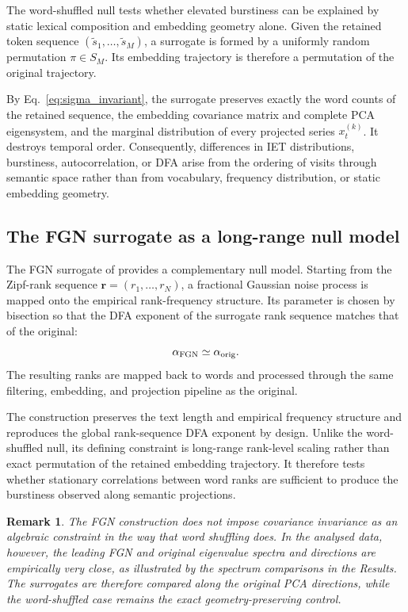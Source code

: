 \documentclass[12pt,a4paper]{article}
\newtheorem{remark}{Remark}
\newcommand{\xtk}{x_t^{(k)}}
\begin{document}
The word-shuffled null tests whether elevated burstiness can be
explained by static lexical composition and embedding geometry alone.
Given the retained token sequence $(\tilde s_1,\ldots,\tilde s_M)$, a
surrogate is formed by a uniformly random permutation
$\pi\in S_M$.
Its embedding trajectory is therefore a permutation of the original
trajectory.

By Eq.~\eqref{eq:sigma_invariant}, the surrogate preserves exactly the
word counts of the retained sequence, the embedding covariance matrix
and complete PCA eigensystem, and the marginal distribution of every
projected series $\xtk$.
It destroys temporal order.
Consequently, differences in IET distributions, burstiness,
autocorrelation, or DFA arise from the ordering of visits through
semantic space rather than from vocabulary, frequency distribution, or
static embedding geometry.

\subsection{The FGN surrogate as a long-range null model}
\label{sec:null_model_fgn}

The FGN surrogate of \citet{DegliEsposti2025} provides a complementary
null model.
Starting from the Zipf-rank sequence
$\mathbf{r}=(r_1,\ldots,r_N)$, a fractional Gaussian noise process is
mapped onto the empirical rank-frequency structure.
Its parameter is chosen by bisection so that the DFA exponent of the
surrogate rank sequence matches that of the original:
\begin{equation}
  \alpha_{\rm FGN}\simeq\alpha_{\rm orig}.
  \label{eq:fgn_dfa_match}
\end{equation}
The resulting ranks are mapped back to words and processed through the
same filtering, embedding, and projection pipeline as the original.

The construction preserves the text length and empirical frequency
structure and reproduces the global rank-sequence DFA exponent by
design.
Unlike the word-shuffled null, its defining constraint is long-range
rank-level scaling rather than exact permutation of the retained
embedding trajectory.
It therefore tests whether stationary correlations between word ranks
are sufficient to produce the burstiness observed along semantic
projections.

\begin{remark}
\label{rem:fgn_cov}
  The FGN construction does not impose covariance invariance as an
  algebraic constraint in the way that word shuffling does.
  In the analysed data, however, the leading FGN and original
  eigenvalue spectra and directions are empirically very close, as
  illustrated by the spectrum comparisons in the Results.
  The surrogates are therefore compared along the original PCA
  directions, while the word-shuffled case remains the exact
  geometry-preserving control.
\end{remark}
\end{document}
